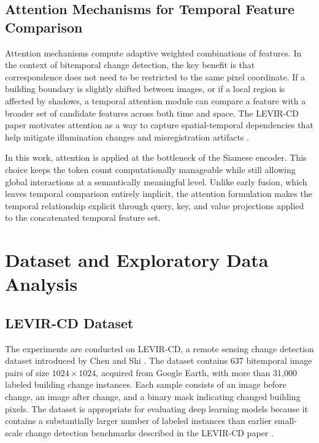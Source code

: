 \documentclass[11pt,a4paper]{article}
\begin{document}
\subsection{Attention Mechanisms for Temporal Feature Comparison}

Attention mechanisms compute adaptive weighted combinations of features. In the context of bitemporal change detection, the key benefit is that correspondence does not need to be restricted to the same pixel coordinate. If a building boundary is slightly shifted between images, or if a local region is affected by shadows, a temporal attention module can compare a feature with a broader set of candidate features across both time and space. The LEVIR-CD paper motivates attention as a way to capture spatial-temporal dependencies that help mitigate illumination changes and misregistration artifacts \cite{chen2020levir}.

In this work, attention is applied at the bottleneck of the Siamese encoder. This choice keeps the token count computationally manageable while still allowing global interactions at a semantically meaningful level. Unlike early fusion, which leaves temporal comparison entirely implicit, the attention formulation makes the temporal relationship explicit through query, key, and value projections applied to the concatenated temporal feature set.

\section{Dataset and Exploratory Data Analysis}
\label{sec:dataset}

\subsection{LEVIR-CD Dataset}

The experiments are conducted on LEVIR-CD, a remote sensing change detection dataset introduced by Chen and Shi \cite{chen2020levir}. The dataset contains 637 bitemporal image pairs of size $1024 \times 1024$, acquired from Google Earth, with more than 31,000 labeled building change instances. Each sample consists of an image before change, an image after change, and a binary mask indicating changed building pixels. The dataset is appropriate for evaluating deep learning models because it contains a substantially larger number of labeled instances than earlier small-scale change detection benchmarks described in the LEVIR-CD paper \cite{chen2020levir}.
\end{document}
